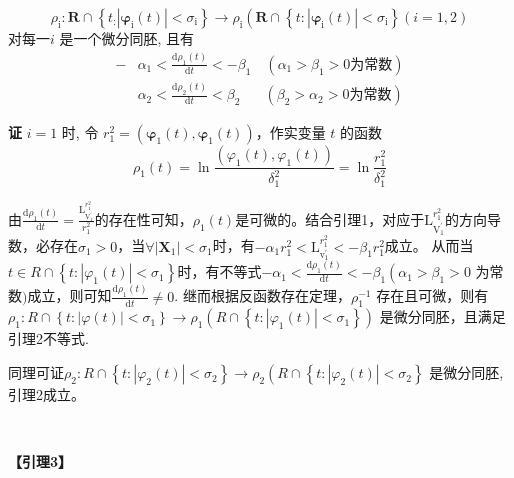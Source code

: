 \documentclass[12pt,a4paper,UTF8]{ctexart}
\begin{document}
$$\rho_{\mathrm{i}}: \mathbf{R} \cap\left\{t_{:}\left|\boldsymbol{\varphi}_{\mathrm{i}}(t)\right|<\sigma_{\mathrm{i}}\right\} \rightarrow \rho_{\mathrm{i}}\left(\mathbf{R} \cap\left\{t:\left|\boldsymbol{\varphi}_{\mathrm{i}}(t)\right|<\sigma_{\mathrm{i}}\right\}(i=1,2)\right.$$
对每一$i$ 是一个微分同胚, 且有
\begin{equation*}
	\begin{aligned}
	-&\alpha_1<\frac{\mathrm{d} \rho_1(t)}{\mathrm{d} t}<-\beta_1 \quad\left(\alpha_1>\beta_1>0\text{为常数} \right)\\
    &\alpha_2<\frac{\mathrm{d} \rho_2(t)}{\mathrm{d} t}<\beta_2 \quad\;\,\;\left(\beta_2>\alpha_2>0 \text{为常数} \right)
    \end{aligned}
\end{equation*}

\textbf{证 }
$i=1$ 时, 令 $r_1^2=\left(\boldsymbol{\varphi}_1(t), \boldsymbol{\varphi}_1(t)\right)$，作实变量 $t$ 的函数
$$
\rho_1(t)=\ln \frac{\left(\varphi_1(t), \varphi_1(t)\right)}{\delta_1^2}=\ln \frac{r_1^2}{\delta_1^2}
$$

由$\frac{\mathrm{d} \rho_1(t)}{\mathrm{d} t}=\frac{\mathrm{L}_{\mathrm{V_1^{\prime}}}^{r_1^{2}}}{r_1^2}$的存在性可知，$\rho_1(t)$是可微的。结合引理1，对应于$\mathrm{L}_{\mathrm{V_1^{\prime}}}^{r_1^{2}}$的方向导数，必存在$\sigma_1>0$，当$\forall \left|\mathbf{X}_{1}\right|<\sigma_{1}$时，有$-\alpha_{1} r_{1}^{2}<\mathrm{L}_{\mathrm{v}_{1}^{\prime}}^{r_{1}^{2}}<-\beta_{1} r_{1}^{2} $成立。
从而当$t \in R \cap\left\{t:\left|\varphi_1(t)\right|<\sigma_1\right\}$时，有不等式$-\alpha_1<\frac{\mathrm{d} \rho_1(t)}{\mathrm{d} t}<-\beta_1\left(\alpha_1>\beta_1>0\right.$ 为常数$)$成立，则可知$\frac{\mathrm{d} \rho_1(t)}{\mathrm{d} t} \neq 0$. 继而根据反函数存在定理，$\rho^{-1}_1$ 存在且可微，则有 $\rho_1: R \cap\left\{t:|\varphi(t)|<\sigma_1\right\} \rightarrow \rho_1\left(R \cap\left\{t:\left|\varphi_1(t)\right|<\sigma_1\right\}\right)$
是微分同胚，且满足引理2不等式.

同理可证$\rho_2: R \cap\left\{t:\left|\varphi_2(t)\right|<\sigma_2\right\} \rightarrow \rho_2\left(R \cap\left\{t:\left|\varphi_2(t)\right|<\sigma_2\right\}\right.$ 是微分同胚, 引理2成立。
		




\begin{spacing}{1.3}
	~
\end{spacing}
\textbf{【引理3】}
\end{document}
